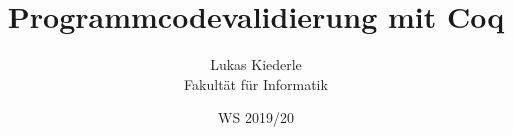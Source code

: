 \documentclass[twoside=true, %
    DIV=15
    ,%
    BCOR=15mm, %
    headinclude=true,
    footinclude=false,
    pagesize,%
    fontsize=11pt,%
    paper=a4,%
    numbers=noenddot
  ]{scrartcl}
\begin{document}
\def\figdir{figures}
\def\tabledir{tables}

\titlehead{
\raggedleft
\texttt{[image: \\figdir/logo-th-rosenheim-2019\_master\_quer\_2c.eps]}
}

\title{
\vspace*{0cm}
Programmcodevalidierung mit Coq
}

\author{
Lukas Kiederle\\
Fakultät für Informatik}

\date{WS 2019/20}

\maketitle

\cleardoubleemptypage

\cleardoubleemptypage

\tableofcontents










\appendix





\end{document}
